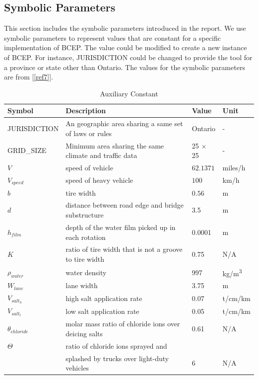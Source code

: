 \documentclass[12pt]{article}
\newcommand{\reref}[1]{\ref{#1}}
\begin{document}
\subsection{Symbolic Parameters}
This section includes the symbolic parameters introduced in the report. We use symbolic parameters to represent values that are constant for a specific implementation of BCEP. The value could be modified to create a new instance of BCEP. For instance, JURISDICTION could be changed to provide the tool for a province or state other than Ontario. The values for the symbolic parameters are from [\reref{ref7}].

\begin{table}[!h]

  \renewcommand{\arraystretch}{1.2}
\noindent \begin{longtable*}{l l l l} 
  \toprule
 \textbf{Symbol} & \textbf{Description} & \textbf{Value} & \textbf{Unit}\\


  \midrule 
  JURISDICTION & An geographic area sharing a same set of laws or rules & Ontario & - \\
  GRID\_SIZE & Minimum area sharing the same climate and traffic data & 25 $\times$ 25 & - \\
  $V$ &  speed of vehicle & $62.1371$ & miles/h   \\
  $V_{speed}$ & speed of heavy vehicle & $100$ & km/h   \\
  $b$ & tire width & $0.56$ & m   \\
  $d$ & distance between road edge and bridge substructure & 3.5 & m
  \\
  $h_{film}$ & depth of the water film picked up in each rotation & 0.0001 & m
  \\
  $K$ & ratio of tire width that is not a groove to tire width & 0.75& N/A
  \\
  $\rho_{water}$ & water density & 997 & \si{kg/m^3}
  \\  
  $W_{lane}$ & lane width & 3.75 & m
  \\  
  $V_{salt_{h}}$ & high salt application rate & 0.07 & t/cm/km \\
  $V_{salt_{l}}$ & low salt application rate & 0.05 & t/cm/km
  \\
  $\theta_{chloride}$ &  molar mass ratio of chloride ions over deicing salts & 0.61 & N/A \\
  $\Theta$ & ratio of chloride ions sprayed and  \\
  & splashed by trucks over light-duty vehicles& 6 & N/A  \\  
  
  \bottomrule
\end{longtable*}
  \caption{Auxiliary Constant} \label{TblConstants}
\end{table}
\end{document}
